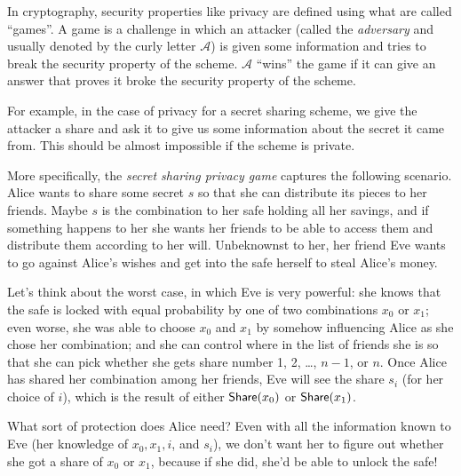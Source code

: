 \documentclass[12 pt]{article}
\def\A{\ensuremath{\mathcal{A}}}
\newcounter{example}[section]
\begin{document}
In cryptography, security properties like privacy are defined using what 
are called ``games''. A game is a challenge in which an attacker (called 
the \emph{adversary} and usually denoted by the curly letter $\mathcal{A}$) is given 
some information and tries to break the security property of the scheme. 
$\A$ ``wins'' the game if it can give an answer that proves it broke 
the security property of the scheme. 

For example, in the case of privacy for a secret sharing scheme, we give 
the attacker a share and ask it to give us some information about the 
secret it came from. This should be almost impossible if the scheme is 
private.

More specifically, the \emph{secret sharing privacy game} captures 
the following scenario. Alice wants to share some secret $s$ so that she
can distribute its pieces to her friends. Maybe $s$ is the combination to
her safe holding all her savings, and if something happens to her she wants
her friends to be able to access them and distribute them according to
her will. Unbeknownst to her, her friend Eve wants to go against Alice's
wishes and get into the safe herself to steal Alice's money.

Let's think about the worst case, in which Eve is very powerful: she knows 
that the safe is locked with equal probability by one of two combinations
$x_0$ or $x_1$; even worse, she was able to choose $x_0$ and $x_1$ by 
somehow influencing Alice as she chose her combination; and she can control
where in the list of friends she is so that she can pick whether she gets
share number 1, 2, \ldots, $n-1$, or $n$. Once Alice has shared her
combination among her friends, Eve will see the share $s_i$ (for her choice
of $i$), which is the result of either $\mathsf{Share}(x_0)$ or $\mathsf{Share}(x_1)$.

What sort of protection does Alice need? Even with all the information 
known to Eve (her knowledge of $x_0, x_1, i$, and $s_i$), we don't want her to figure
out whether she got a share of $x_0$ or $x_1$, because if she did, she'd
be able to unlock the safe!
\end{document}

